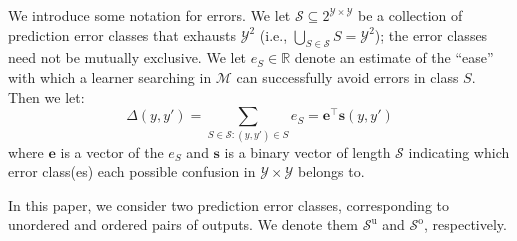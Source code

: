 \documentclass{article} %
\newcommand{\unorderedS}{\mathcal{S}^{\mathrm{u}}}
\newcommand{\orderedS}{\mathcal{S}^{\mathrm{o}}}
\begin{document}
We introduce some notation for errors.
We let $\mathcal{S} \subseteq 2^{\mathcal{Y}\times\mathcal{Y}}$ be a
collection of prediction error classes that exhausts $\mathcal{Y}^2$ (i.e., $\bigcup_{S \in
  \mathcal{S}} S = \mathcal{Y}^2$); the error classes need not be
mutually exclusive.  We let $e_{S} \in \mathbb{R}$ denote an estimate
of the ``ease'' with which a learner searching in $\mathcal{M}$ 
can successfully avoid errors in class $S$.  Then we let:
\begin{equation}
\Delta(y, y') = \sum_{S \in \mathcal{S}: (y, y') \in S} e_S =
\mathbf{e}^\top \mathbf{s}(y, y')
\end{equation}
where $\mathbf{e}$ is a vector of the $e_S$ and $\mathbf{s}$ is a
binary vector of length $\mathcal{S}$ indicating which error class(es)
each possible confusion in $\mathcal{Y}\times\mathcal{Y}$ belongs to.

In this paper, we consider two prediction error classes, corresponding
to unordered and ordered pairs of outputs.  We denote them
$\unorderedS$ and $\orderedS$, respectively.  




\end{document}
